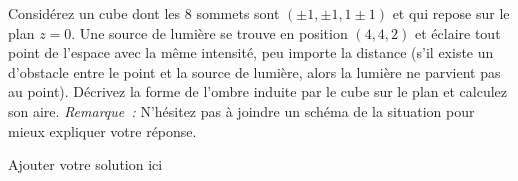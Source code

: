 \documentclass[12pt,addpoints]{exam}
\begin{document}
\begin{questions}
\question[20]
Considérez un cube dont les 8 sommets sont $(\pm 1, \pm 1, 1 \pm 1)$ et qui repose sur le plan $z = 0$. Une source de lumière se trouve en position $(4,4,2)$ et éclaire tout point de l'espace avec la même intensité, peu importe la distance (s'il existe un d'obstacle entre le point et la source de lumière, alors la lumière ne parvient pas au point). Décrivez la forme de l'ombre induite par le cube sur le plan et calculez son aire. \emph{Remarque~:} N'hésitez pas à joindre un schéma de la situation pour mieux expliquer votre réponse.
\begin{solution}
Ajouter votre solution ici
\end{solution}

\end{questions}
\end{document}
